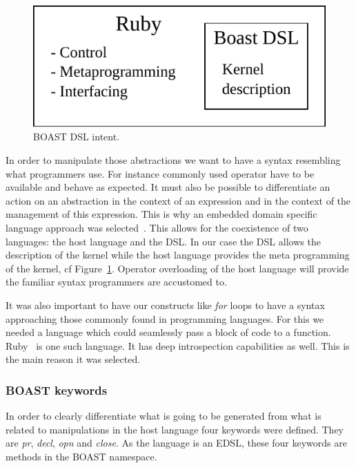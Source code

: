\documentclass[11pt, a4paper, twoside]{montblanc}
\begin{document}
\begin{figure}
\begin{center}
\includegraphics[scale=0.8]{BOAST_DSL.pdf}
\caption{BOAST DSL intent.}
\label{fig:dsl}
\end{center}
\end{figure}

In order to manipulate those abstractions we want to have a syntax resembling
what programmers use. For instance commonly used operator have to be available
and behave as expected. It must also be possible to differentiate an action on
an abstraction in the context of an expression and in the context of the
management of this expression. This is why an embedded domain specific language
approach was selected~\cite{hudak1996building}. This allows for the coexistence
of two languages: the host language and the DSL. In our case the DSL allows the
description of the kernel while the host language provides the meta programming
of the kernel, cf Figure~\ref{fig:dsl}. Operator overloading of the host
language will provide the familiar syntax programmers are accustomed to.

It was also important to have our constructs like \emph{for} loops to have a
syntax approaching those commonly found in programming languages. For this we
needed a language which could seamlessly pass a block of code to a function.
Ruby~\cite{matsumoto2002ruby} is one such language. It has deep introspection
capabilities as well. This is the main reason it was selected.

    \subsubsection{BOAST keywords}


In order to clearly differentiate what is going to be generated from what is
related to manipulations in the host language four keywords were defined. They
are \emph{pr}, \emph{decl}, \emph{opn} and \emph{close}. As the language is
an EDSL, these four keywords are methods in the BOAST namespace.
\end{document}
